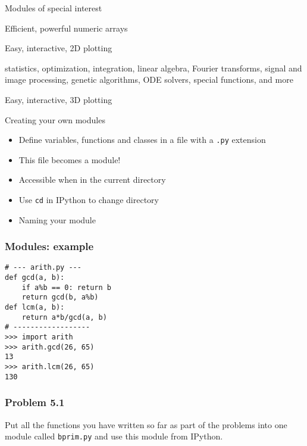 \documentclass[14pt,compress]{beamer}
\newcounter{time}
\newcommand{\inctime}[1]{\addtocounter{time}{#1}{\tiny \thetime\ m}}
\newcommand{\typ}[1]{\texttt{#1}}
\begin{document}
\begin{frame}[fragile]
    {Modules of special interest}
    \begin{description}[matplotlibfor2d]

        \item[\typ{numpy}] Efficient, powerful numeric arrays

        \item[\typ{matplotlib}] Easy, interactive, 2D plotting

        \item[\typ{scipy}] statistics, optimization, integration, linear
            algebra, Fourier transforms, signal and image processing,
            genetic algorithms, ODE solvers, special functions, and more

        \item[Mayavi] Easy, interactive, 3D plotting

    \end{description}
\end{frame}

\begin{frame}[fragile]
    {Creating your own modules}
  \begin{itemize}
  \item Define variables, functions and classes in a file with a
    \typ{.py} extension
  \item This file becomes a module!
  \item Accessible when in the current directory
  \item Use \typ{cd} in IPython to change directory

  \item Naming your module
      \end{itemize}
\end{frame}

\begin{frame}[fragile]
  \frametitle{Modules: example}
  \begin{lstlisting}
# --- arith.py ---
def gcd(a, b):
    if a%b == 0: return b
    return gcd(b, a%b)
def lcm(a, b):
    return a*b/gcd(a, b)
# ------------------
>>> import arith
>>> arith.gcd(26, 65)
13
>>> arith.lcm(26, 65)
130
  \end{lstlisting}
\end{frame}

\begin{frame}[fragile]
  \frametitle{Problem 5.1}

  Put all the functions you have written so far as part of the problems
  into one module called \typ{bprim.py} and use this module from IPython.

\inctime{25}
\end{frame}
\end{document}
